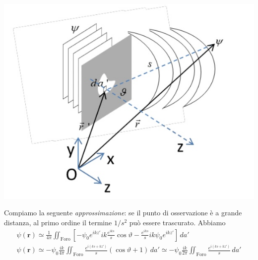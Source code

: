 \begin{marginfigure}
	\includegraphics[width = 1.25 \textwidth, height = 1.25 \textheight]{figs/kirchhoff-diffraction-2}
	\label{fig:kirchhoff2}
\end{marginfigure}

Compiamo la seguente \emph{approssimazione}: se il punto di osservazione
è a grande distanza, al primo ordine il termine \(1/s^2\) può essere
trascurato. Abbiamo
\begin{gather*}
	\psi(\bm{r}) \simeq \frac{1}{4 \pi} \iint_{\text{Foro}} \left[-\psi_0 e^{ikz'} ik\frac{e^{iks}}{s} \cos \vartheta - \frac{e^{iks}}{s}ik\psi_0 e^{ikz'} \right]\, da'\\
	\psi(\bm{r}) \simeq -\psi_0 \frac{ik}{4 \pi} \iint_{\text{Foro}} \frac{e^{i(ks+kz')}}{s}(\cos \vartheta + 1)\, da' \simeq -\psi_0 \frac{ik}{2 \pi} \iint_{\text{Foro}} \frac{e^{i(ks+kz')}}{s}\,da'\\
\end{gather*}




